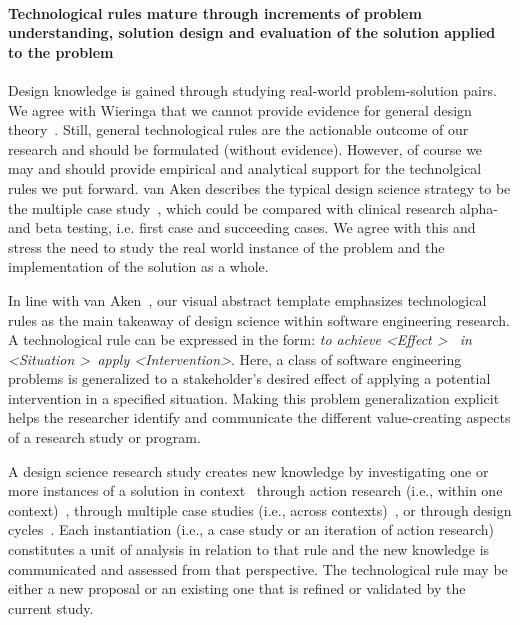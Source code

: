 \documentclass[graybox]{svmult}
\begin{document}
\paragraph{Technological rules mature through increments of problem understanding, solution design and evaluation of the solution applied to the problem} 

Design knowledge is gained through studying real-world problem-solution pairs. We agree with Wieringa that we cannot provide evidence for general design theory~\cite{wieringa_six_2015}. Still, general technological rules are the actionable outcome of our research and should be formulated (without evidence). However, of course we may and should provide empirical and analytical support for the technolgical rules we put forward. van Aken describes the typical design science strategy to be the multiple case study~\cite{van_aken_management_2004}, which could be compared with clinical research alpha- and beta testing, i.e. first case and succeeding cases. We agree with this and stress the need to study the real world instance of the problem and the implementation of the solution as a whole.

In line with van Aken~\cite{aken_management_2004}, our visual abstract template emphasizes technological rules as the main takeaway of design science within software engineering research. A technological rule can be expressed in the form: 
\emph{to achieve \textless Effect \textgreater ~ in \textless Situation \textgreater~apply \textless Intervention\textgreater}. 
Here, a class of software engineering problems is generalized to a stakeholder's desired effect of applying a potential intervention in a specified situation. 
Making this problem generalization explicit helps the researcher identify and communicate the different value-creating aspects of a research study or program. 

A design science research study creates new knowledge by investigating one or more instances of a solution in context~\cite{wieringa_what_2014} through action research (i.e., within one context)~\cite{wieringa_technical_2012}, through multiple case studies (i.e., across contexts)~\cite{aken_management_2004}, or through design cycles~\cite{gregor_positioning_2013}. Each instantiation (i.e., a case study or an iteration of action research) constitutes a unit of analysis in relation to that rule and the new knowledge is communicated and assessed from that perspective. 
The technological rule may be either a new proposal or an existing one that is refined or validated by the current study. 
\end{document}

